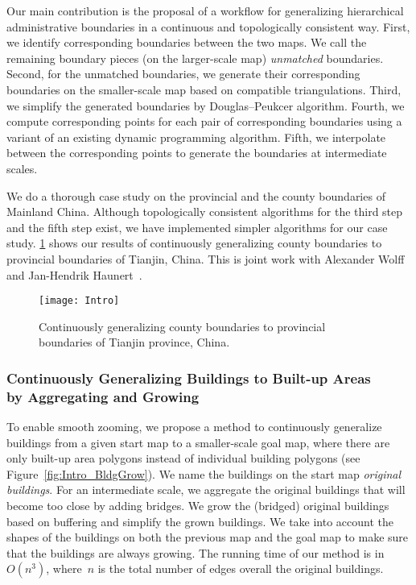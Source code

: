 Our main contribution is the proposal of a workflow for
generalizing hierarchical administrative boundaries in a
continuous and topologically consistent way.  First, we
identify corresponding boundaries between the two maps.
We call the remaining boundary pieces (on the larger-scale map)
\emph{unmatched} boundaries.  
Second, for the unmatched boundaries,
we generate their corresponding boundaries 
on the smaller-scale map
based on compatible triangulations. 
Third, we simplify the generated boundaries
by Douglas--Peukcer algorithm.  
Fourth, we compute corresponding points for each pair
of corresponding boundaries using a variant of an existing 
dynamic programming algorithm.  
Fifth, we interpolate between the corresponding points
to generate the boundaries at intermediate scales.

We do a thorough case study 
on the provincial and the county boundaries of Mainland China.
Although topologically consistent algorithms 
for the third step and the fifth step exist, 
we have implemented simpler algorithms for our case study. 
\fig\ref{fig:Intro_AdminBound_Tianjin} shows our results of 
continuously generalizing county boundaries 
to provincial boundaries of Tianjin, China.
This is joint work with Alexander Wolff 
and Jan-Hendrik Haunert~\parencite[see][]{Peng2016Admin}.

\begin{figure}[tb]
\centering
\texttt{[image: Intro]}
\caption{Continuously generalizing county boundaries to 
provincial boundaries of Tianjin province, China.}
\label{fig:Intro_AdminBound_Tianjin}
\end{figure}

\subsubsection{%
Continuously Generalizing Buildings to Built-up Areas\\
by Aggregating and Growing}

To enable smooth zooming, 
we propose a method to continuously generalize buildings 
from a given start map to a smaller-scale goal map, 
where there are only built-up area polygons 
instead of individual building polygons
(see Figure~\ref{fig:Intro_BldgGrow}).
We name the buildings on the start map 
\emph{original buildings}.
%
For an intermediate scale, 
we aggregate the original buildings that will become too close 
by adding bridges.
We grow the (bridged) original buildings based on buffering 
and simplify the grown buildings.
We take into account the shapes of the buildings 
on both the previous map and the goal map to make sure that 
the buildings are always growing.
The running time of our method is in~$O(n^3)$,
where~$n$ is the total number of edges
overall the original buildings.
%

